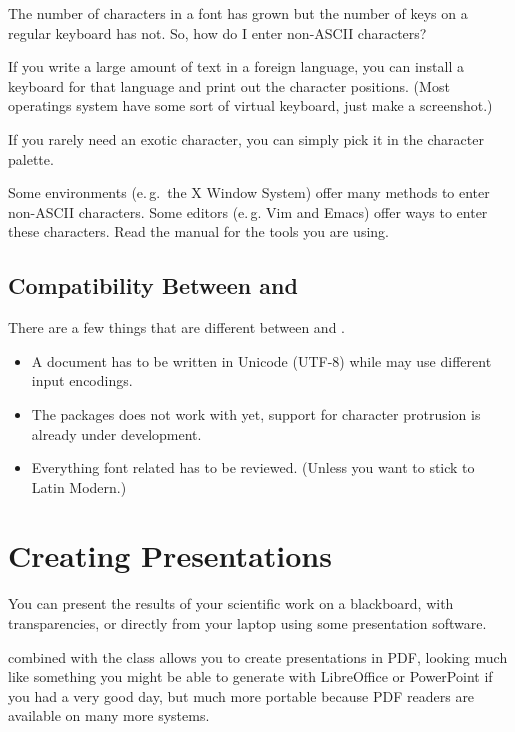 The number of characters in a font has grown but the number of keys on a
regular keyboard has not. So, how do I enter non-ASCII characters?

If you write a large amount of text in a foreign language, you can install a
keyboard for that language and print out the character positions. (Most
operatings system have some sort of virtual keyboard, just make a
screenshot.)

If you rarely need an exotic character, you can simply pick it in the
character palette.

Some environments (e.\,g.\ the X Window System) offer many methods to enter
non-ASCII characters. Some editors (e.\,g. Vim and Emacs) offer ways to
enter these characters. Read the manual for the tools you are using.

\subsection{Compatibility Between  and }

There are a few things that are different between  and .

\begin{itemize}
  \item A  document has to be written in
        Unicode (UTF-8) while  may use different input encodings.
  \item The  packages does not work with  yet,
        support for character protrusion is already under development.
  \item Everything font related has to be reviewed. (Unless you want to stick
        to Latin Modern.)
\end{itemize}

\section{Creating Presentations}%
\label{sec:beamer}
You can present the results of your scientific work on a blackboard,
with transparencies, or directly from your laptop using some
presentation software.

 combined with the  class allows you to
create presentations in PDF, looking much like something you might be
able to generate with LibreOffice or PowerPoint if you had a very good day, but much
more portable because PDF readers are available on many more
systems.

